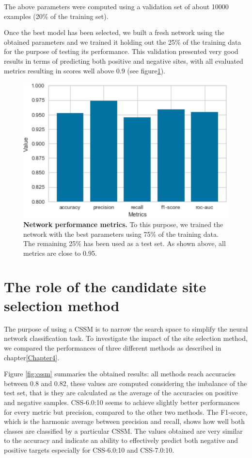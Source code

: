 The above parameters were computed using a validation set of about 10000 examples (20\% of the training set).

Once the best model has been selected, we built a fresh network using the obtained parameters and we trained it holding out the 25\% of the training data for the purpose of testing its performance. This validation presented very good results in terms of predicting both positive and negative sites, with all evaluated metrics resulting in scores well above 0.9 (see figure\ref{fig:network_evaluation}). 

\begin{figure}[hbt!]
	\centering
	\includegraphics[width=\textwidth]{Figures/network_evaluation}
	\caption{\textbf{Network performance metrics.} To this purpose, we trained the network with the best parameters using 75\% of the training data. The remaining 25\% has been used as a test set. As shown above, all metrics are close to 0.95.}
	\label{fig:network_evaluation}
\end{figure}


\section{The role of the candidate site selection method}
The purpose of using a CSSM is to narrow the search space to simplify the neural network classification task. To investigate the impact of the site selection method, we compared the performances of three different methods as described in chapter\ref{Chapter4}. 

Figure \ref{fig:cssm} summaries the obtained results: all methods reach accuracies between 0.8 and 0.82, these values are computed considering the imbalance of the test set, that is they are calculated as the average of the accuracies on positive and negative samples. CSS-6.0:10 seems to achieve slightly better performances for every metric but precision, compared to the other two methods. The F1-score, which is the harmonic average between precision and recall, shows how well both classes are classified by a particular CSSM. The values obtained are very similar to the accuracy and indicate an ability to effectively predict both negative and positive targets especially for CSS-6.0:10 and CSS-7.0:10.

